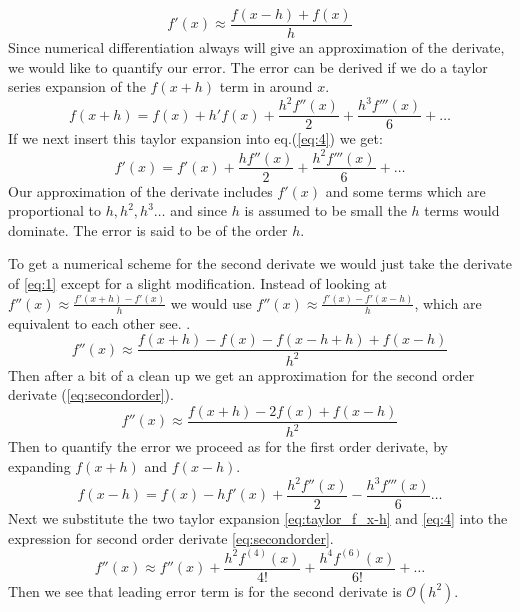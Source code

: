 \begin{equation}\label{eq:5}
  f'(x) \approx \frac{f(x-h)+f(x)}{h}
\end{equation}
Since numerical differentiation always will give an approximation of the
derivate, we would like to quantify our error. The error can be derived 
if we do a taylor series expansion of the $f(x+h)$ term in around $x$.
\begin{equation}\label{eq:4}
    f(x+h) = f(x) + h'f(x) + \frac{h^2f''(x)}{2} + \frac{h^3f'''(x)}{6} + \dots    
\end{equation}   
If we next insert this taylor expansion into eq.(\ref{eq:4}) we get:
\begin{equation}
  f'(x) = f'(x) + \frac{h f''(x)}{2} + \frac{h^2f'''(x)}{6} + \dots
\end{equation} 
Our approximation of the derivate includes $f'(x)$ and some terms which are
proportional to $h, h^2, h^3 \dots $ and since $h$ is assumed to be small the
$h$ terms would dominate. The error is said to be of the order $h$. 
\par
To get a numerical scheme for the second derivate we would just take the
derivate of \cref{eq:1} except for a slight modification. Instead of looking at $f''(x) \approx \frac{f'(x+h)-f'(x)}{h}$ we would use 
$f''(x) \approx\frac{f'(x)-f'(x-h)}{h}$, which are equivalent to each other
see. \cite{mathexh}. 
\begin{equation}
  f''(x) \approx \frac{f(x + h) - f(x) -f(x-h+h) +f(x-h)}{h^2}
\end{equation}
Then after a bit of a clean up we get an approximation for the second order
derivate (\cref{eq:secondorder}). 
\begin{equation}\label{eq:secondorder}
  f''(x) \approx \frac{f(x+h)-2f(x) + f(x-h)}{h^2}
\end{equation}
Then to quantify the error we proceed as for the first order derivate, by
expanding $f(x+h)$ and $f(x-h)$. 
\begin{equation}\label{eq:taylor_f_x-h}
  f(x-h) = f(x)- h f'(x) + \frac{h^2 f''(x)}{2} - \frac{h^3f'''(x)}{6} \dots 
\end{equation} 
Next we substitute the two taylor expansion \cref{eq:taylor_f_x-h} and 
\cref{eq:4} into the expression for second order derivate \cref{eq:secondorder}.
\begin{equation}
  f''(x) \approx f''(x) + \frac{h^2f^{(4)}(x)}{4!} + \frac{h^4 f^{(6)}(x)}{6!} + \dots
\end{equation}
Then we see that leading error term is for the second derivate is 
$\mathcal{O}(h^2)$.   

